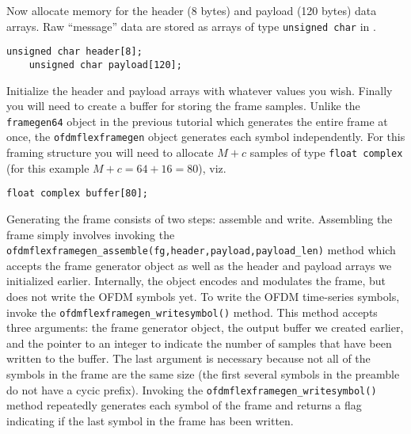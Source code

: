 Now allocate memory for the header (8 bytes) and payload (120 bytes)
data arrays.
Raw ``message'' data are stored as arrays of type {\tt unsigned char} in
\liquid.
%
\begin{Verbatim}[fontsize=\small]
    unsigned char header[8];
    unsigned char payload[120];
\end{Verbatim}
%
Initialize the header and payload arrays with whatever values you wish.
%
Finally you will need to create a buffer for storing the frame samples.
Unlike the {\tt framegen64} object in the previous tutorial which
generates the entire frame at once,
the {\tt ofdmflexframegen} object generates each symbol independently.
For this framing structure you will need to allocate $M+c$ samples of
type {\tt float complex} (for this example $M+c = 64+16 = 80$), viz.
%
\begin{Verbatim}[fontsize=\small]
    float complex buffer[80];
\end{Verbatim}
%
Generating the frame consists of two steps: assemble and write.
Assembling the frame simply involves invoking
the {\tt ofdmflexframegen\_assemble(fg,header,payload,payload\_len)}
method which accepts the frame generator object as well as the header
and payload arrays we initialized earlier.
Internally, the object encodes and modulates the frame, but does not
write the OFDM symbols yet.
To write the OFDM time-series symbols, invoke the
{\tt ofdmflexframegen\_writesymbol()}
method.
This method accepts three arguments:
  the frame generator object,
  the output buffer we created earlier,
  and the pointer to an integer to indicate the number of samples that
  have been written to the buffer.
The last argument is necessary because not all of the symbols in the
frame are the same size (the first several symbols in the preamble do
not have a cycic prefix).
Invoking the {\tt ofdmflexframegen\_writesymbol()} method repeatedly
generates each symbol of the frame
and returns a flag indicating if the last symbol in the frame has been
written.

